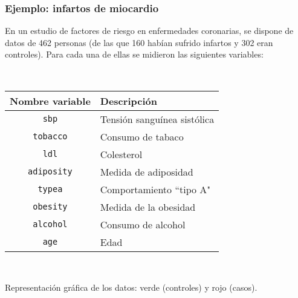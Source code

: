 \documentclass{beamer}
\begin{document}
\begin{frame}
\frametitle{Ejemplo: infartos de miocardio}

En un estudio de factores de riesgo en enfermedades coronarias, se dispone de datos de 462 personas (de las que 160 habían sufrido infartos y 302 eran controles). Para cada una de ellas se midieron las siguientes variables:

\

\begin{center}
{\scriptsize

\begin{tabular}{|c|l|}
\hline Nombre variable & Descripci\'{o}n  \\
\hline {\tt sbp} & Tensión sanguínea sistólica \\
{\tt tobacco} & Consumo de tabaco\\
{\tt ldl} & Colesterol\\
{\tt adiposity} & Medida de adiposidad\\
{\tt typea} & Comportamiento ``tipo A"\\
{\tt obesity} & Medida de la obesidad\\
{\tt alcohol} & Consumo de alcohol\\
{\tt age} & Edad \\
 \hline
 \end{tabular}

 }
\end{center}
 
 \

Representación gráfica de los datos: verde (controles)  y rojo (casos).


\end{frame}
\end{document}
